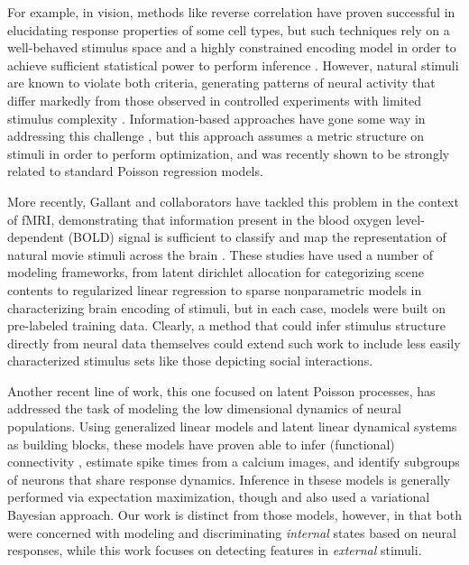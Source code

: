 \documentclass{article} %
\begin{document}
For example, in vision, methods like reverse correlation have proven successful in elucidating response properties of some cell types, but such techniques rely on a well-behaved stimulus space and a highly constrained encoding model in order to achieve sufficient statistical power to perform inference \cite{steveninck1988realtime,ringach2004reverse,ringach2002receptive}. However, natural stimuli are known to violate both criteria, generating patterns of neural activity that differ markedly from those observed in controlled experiments with limited stimulus complexity \cite{ringach2002receptive,sharpee2004analyzing,Vinje2000-dx}. Information-based approaches have gone some way in addressing this challenge \cite{sharpee2004analyzing}, but this approach assumes a metric structure on stimuli in order to perform optimization, and was recently shown to be strongly related to standard Poisson regression models\cite{Williamson2013-rg}.

More recently, Gallant and collaborators have tackled this problem in the context of fMRI, demonstrating that information present in the blood oxygen level-dependent (BOLD) signal is sufficient to classify and map the representation of natural movie stimuli across the brain \cite{Vu2011-da,Huth2012-cj,Stansbury2013-nm}. These studies have used a number of modeling frameworks, from latent dirichlet allocation for categorizing scene contents \cite{Stansbury2013-nm} to regularized linear regression \cite{Huth2012-cj} to sparse nonparametric models \cite{Vu2011-da} in characterizing brain encoding of stimuli, but in each case, models were built on pre-labeled training data. Clearly, a method that could infer stimulus structure directly from neural data themselves could extend such work to include less easily characterized stimulus sets like those depicting social interactions.

Another recent line of work, this one focused on latent Poisson processes, has addressed the task of modeling the low dimensional dynamics of neural populations\cite{Pillow2008-em,Vogelstein2009-ax,Park2014-el,Buesing2014-ta}. Using generalized linear models and latent linear dynamical systems as building blocks, these models have proven able to infer (functional) connectivity \cite{Pillow2008-em}, estimate spike times from a calcium images\cite{Vogelstein2009-ax}, and identify subgroups of neurons that share response dynamics\cite{Buesing2014-ta}. Inference in thsese models is generally performed via expectation maximization, though \cite{Ulrich2014-zc} and \cite{Putzky2014-up} also used a variational Bayesian approach. Our work is distinct from those models, however, in that both were concerned with modeling and discriminating \emph{internal} states based on neural responses, while this work focuses on detecting features in \emph{external} stimuli. 
\end{document}
